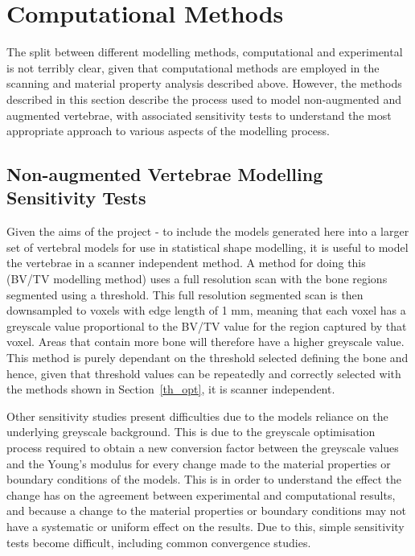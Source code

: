 \section{Computational Methods}

The split between different modelling methods, computational and experimental is not terribly clear, given that computational methods are employed in the scanning and material property analysis described above.
However, the methods described in this section describe the process used to model non-augmented and augmented vertebrae, with associated sensitivity tests to understand the most appropriate approach to various aspects of the modelling process.




\subsection{Non-augmented Vertebrae Modelling Sensitivity Tests}\label{sec:non_aug_sens}

Given the aims of the project - to include the models generated here into a
larger set of vertebral models for use in statistical shape modelling, it is
useful to model the vertebrae in a scanner independent method. A method for
doing this (BV/TV modelling method) uses a full resolution scan with the bone
regions segmented using a threshold. This full resolution segmented scan is then
downsampled to voxels with edge length of 1 mm, meaning that each voxel has a
greyscale value proportional to the BV/TV value for the region captured by that
voxel. Areas that contain more bone will therefore have a higher greyscale
value. This method is purely dependant on the threshold selected defining the
bone and hence, given that threshold values can be repeatedly and correctly
selected with the methods shown in Section~\ref{th_opt}, it is scanner independent.

Other sensitivity studies present difficulties due to the models reliance on the underlying greyscale background.
This is due to the greyscale optimisation process required to obtain a new conversion factor between the greyscale values and the Young's modulus for every change made to the material properties or boundary conditions of the models.
This is in order to understand the effect the change has on the agreement between experimental and computational results, and because a change to the material properties or boundary conditions may not have a systematic or uniform effect on the results.
Due to this, simple sensitivity tests become difficult, including common convergence studies.

